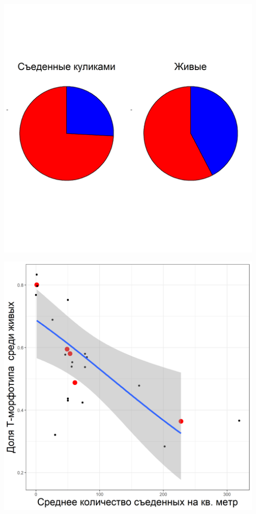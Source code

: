 \documentclass[20pt,a0,portrait]{a0poster}
\begin{document}
\begin{minipage}[t]{0.5\linewidth}
\begin{minipage}[t]{0.46\linewidth}		
	\begin{center}\vspace{0.1cm}
			\includegraphics[width=0.9\linewidth]{Pay_charts_hem.png}
			\label{Pay_charts_hem}
		\end{center}
\end{minipage}\hspace{1cm}
%
\begin{minipage}[t]{0.46\linewidth}		
	\begin{center}\vspace{0.1cm}
			\includegraphics[width=0.9\linewidth]{N_dead_Prop_T_hem.png}

\end{center}
\end{minipage}
\end{minipage}
\end{document}

